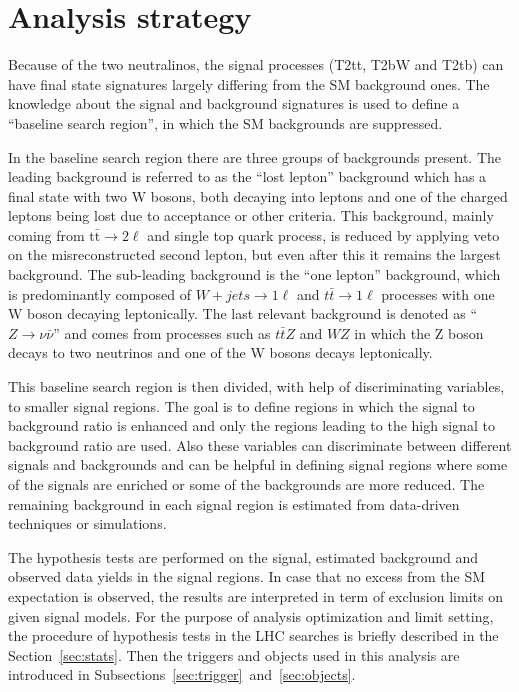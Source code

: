 \section{Analysis strategy~\label{sec:strategy}}

Because of the two neutralinos, the signal processes (T2tt, T2bW and T2tb)  can have final state signatures largely differing from the SM background ones. The knowledge about the signal and background signatures is used to define a ``baseline search region'', in which the SM backgrounds are suppressed. 

In the baseline search region there are three groups of backgrounds present. The leading background is referred to as the ``lost lepton'' background which has a final state with two W bosons, both decaying into leptons and one of the charged leptons being lost due to acceptance or other criteria. This background, mainly coming from $\mathrm{t\bar{t}} \to 2 \ell$ and single top quark process,  is reduced by applying veto on the misreconstructed second lepton, but even after this it remains the largest background. The sub-leading background is the ``one lepton'' background, which is predominantly composed of $W+jets \to 1\ell$ and $t\bar{t} \to 1 \ell$ processes with one W boson decaying leptonically. The last relevant background is denoted as ``$Z \to \nu \bar{\nu}$'' and comes from processes such as $t\bar{t}Z$ and $WZ$ in which the Z boson decays to two neutrinos and one of the W bosons decays leptonically.  

This baseline search region is then divided,  with help of discriminating variables, to smaller signal regions. The goal is to define regions in which the signal to background ratio is enhanced and only the regions leading to the high signal to background ratio are used. Also these variables can discriminate between different signals and backgrounds and can be helpful in defining signal regions where some of the signals are enriched or some of the backgrounds are more reduced. The remaining background in each signal region is estimated from data-driven techniques or simulations. 

The hypothesis tests are performed on the signal, estimated background and observed data yields in the signal regions. In case that no excess from the SM expectation is observed, the results are interpreted in term of exclusion limits on given signal models. For the purpose of analysis optimization and limit setting, the procedure of hypothesis tests in the LHC searches is briefly described in the Section~\ref{sec:stats}. Then the triggers and objects used in this analysis are introduced in Subsections~\ref{sec:trigger}~and~\ref{sec:objects}.
 
